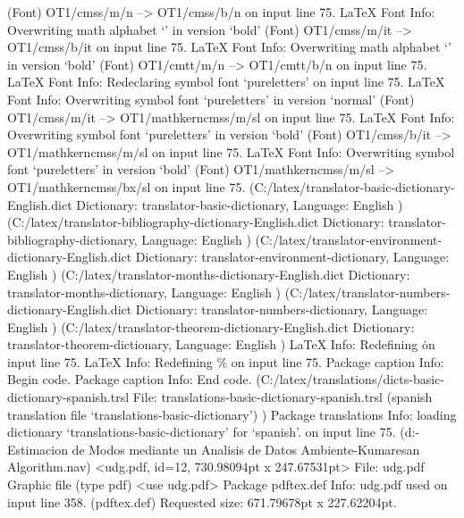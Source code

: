 (Font)                  OT1/cmss/m/n --> OT1/cmss/b/n on input line 75.
LaTeX Font Info:    Overwriting math alphabet `\mathit' in version `bold'
(Font)                  OT1/cmss/m/it --> OT1/cmss/b/it on input line 75.
LaTeX Font Info:    Overwriting math alphabet `\mathtt' in version `bold'
(Font)                  OT1/cmtt/m/n --> OT1/cmtt/b/n on input line 75.
LaTeX Font Info:    Redeclaring symbol font `pureletters' on input line 75.
LaTeX Font Info:    Overwriting symbol font `pureletters' in version `normal'
(Font)                  OT1/cmss/m/it --> OT1/mathkerncmss/m/sl on input line 75.
LaTeX Font Info:    Overwriting symbol font `pureletters' in version `bold'
(Font)                  OT1/cmss/b/it --> OT1/mathkerncmss/m/sl on input line 75.
LaTeX Font Info:    Overwriting symbol font `pureletters' in version `bold'
(Font)                  OT1/mathkerncmss/m/sl --> OT1/mathkerncmss/bx/sl on input line 75.
 (C:\Users\SEARS\AppData\Local\Programs\MiKTeX\tex/latex/translator\translator-basic-dictionary-English.dict
Dictionary: translator-basic-dictionary, Language: English 
) (C:\Users\SEARS\AppData\Local\Programs\MiKTeX\tex/latex/translator\translator-bibliography-dictionary-English.dict
Dictionary: translator-bibliography-dictionary, Language: English 
) (C:\Users\SEARS\AppData\Local\Programs\MiKTeX\tex/latex/translator\translator-environment-dictionary-English.dict
Dictionary: translator-environment-dictionary, Language: English 
) (C:\Users\SEARS\AppData\Local\Programs\MiKTeX\tex/latex/translator\translator-months-dictionary-English.dict
Dictionary: translator-months-dictionary, Language: English 
) (C:\Users\SEARS\AppData\Local\Programs\MiKTeX\tex/latex/translator\translator-numbers-dictionary-English.dict
Dictionary: translator-numbers-dictionary, Language: English 
) (C:\Users\SEARS\AppData\Local\Programs\MiKTeX\tex/latex/translator\translator-theorem-dictionary-English.dict
Dictionary: translator-theorem-dictionary, Language: English 
)
LaTeX Info: Redefining \. on input line 75.
LaTeX Info: Redefining \% on input line 75.
Package caption Info: Begin \AtBeginDocument code.
Package caption Info: End \AtBeginDocument code.
 (C:\Users\SEARS\AppData\Local\Programs\MiKTeX\tex/latex/translations/dicts\translations-basic-dictionary-spanish.trsl
File: translations-basic-dictionary-spanish.trsl (spanish translation file `translations-basic-dictionary')
)
Package translations Info: loading dictionary `translations-basic-dictionary' for `spanish'. on input line 75.
 (d:\Tesis - Estimacion de Modos mediante un Analisis de Datos Ambiente\Tufts-Kumaresan Algorithm\Avances\cartel\archivoslatex\main.nav)
<udg.pdf, id=12, 730.98094pt x 247.67531pt>
File: udg.pdf Graphic file (type pdf)
<use udg.pdf>
Package pdftex.def Info: udg.pdf  used on input line 358.
(pdftex.def)             Requested size: 671.79678pt x 227.62204pt.

